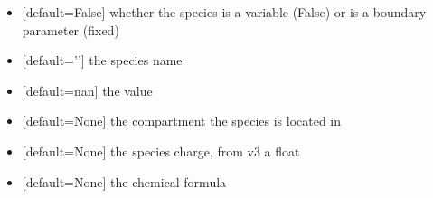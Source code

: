 \documentclass[letterpaper,12pt,english]{sphinxmanual}
\begin{document}
\begin{fulllineitems}
\begin{fulllineitems}
\begin{itemize}
\item {} 
\sphinxAtStartPar
{} {[}default=False{]} whether the species is a variable (False) or is a boundary parameter (fixed)

\item {} 
\sphinxAtStartPar
{} {[}default=’’{]} the species name

\item {} 
\sphinxAtStartPar
{} {[}default=nan{]} the value 

\item {} 
\sphinxAtStartPar
{} {[}default=None{]} the compartment the species is located in

\item {} 
\sphinxAtStartPar
{} {[}default=None{]} the species charge, from v3 a float

\item {} 
\sphinxAtStartPar
{} {[}default=None{]} the chemical formula

\end{itemize}

\end{fulllineitems}


\begin{fulllineitems}
\label{\detokenize{api/core:cbmpy.CBModel.Species.value}}
\pysigstartsignatures
\pysigline
{}
\pysigstopsignatures
\end{fulllineitems}


\begin{fulllineitems}
\label{\detokenize{api/core:cbmpy.CBModel.Species.is_boundary}}
\pysigstartsignatures
\pysigline
{}
\pysigstopsignatures
\end{fulllineitems}



\end{fulllineitems}
\end{document}
